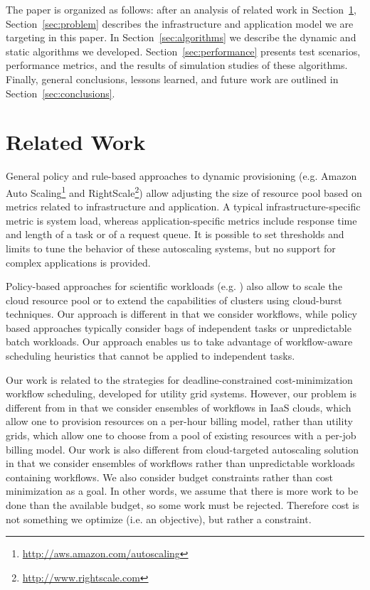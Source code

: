 \documentclass[conference]{IEEEtran}
\begin{document}
The paper is organized as follows: after an analysis of related work in
Section~\ref{sec:related}, Section~\ref{sec:problem} describes the
infrastructure and application model we are targeting in this paper.
In Section~\ref{sec:algorithms} we describe the dynamic and
static algorithms we developed. Section~\ref{sec:performance} presents test
scenarios, performance metrics, and the results of simulation studies of these algorithms.
Finally, general conclusions, lessons learned, and future work are outlined in
Section~\ref{sec:conclusions}.

\section{Related Work}
\label{sec:related}
General policy and rule-based approaches to dynamic provisioning (e.g. Amazon
Auto Scaling\footnote{\url{http://aws.amazon.com/autoscaling}} and
RightScale\footnote{\url{http://www.rightscale.com}}) allow adjusting the size
of resource pool based on metrics related to infrastructure and application.
A typical infrastruc\-ture-specific metric is system load, whereas
application-speci\-fic metrics include response time and length of a task or
of a request queue. It is possible to set thresholds and limits to tune the behavior
of these autoscaling systems, but no support for complex applications is provided.

Policy-based approaches for scientific workloads (e.g. \cite{Marshall2010,
Kim2011}) also allow to scale the cloud resource pool or to extend the
capabilities of clusters using cloud-burst techniques. Our approach is different
in that we consider workflows, while policy based approaches typically consider
bags of independent tasks or unpredictable batch workloads. Our approach enables us to
take advantage of workflow-aware scheduling heuristics that cannot be applied to
independent tasks.


Our work is related to the strategies for deadline-con\-strained
cost-minimization workflow scheduling, developed for utility grid systems. However, our problem is
different from \cite{Yu2005, Abrishami2010} in that we consider ensembles of workflows in
IaaS clouds, which allow one to provision resources on a per-hour billing model,
rather than utility grids, which allow one to choose from a pool of existing
resources with a per-job billing model. Our work is also different from
cloud-targeted autoscaling solution~\cite{Mao2011} in that we consider ensembles
of workflows rather than unpredictable workloads containing workflows. We also consider budget constraints
rather than cost minimization as a goal. In other words, we assume that there is
more work to be done than the available budget, so some work must be rejected.
Therefore cost is not something we optimize (i.e. an objective), but rather a constraint.
\end{document}

